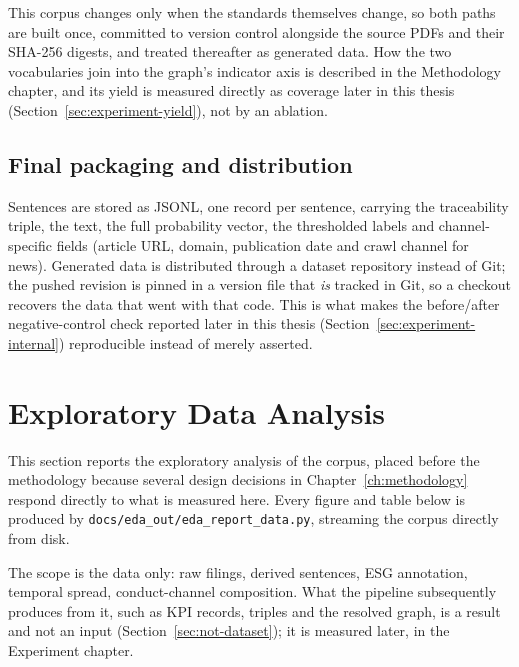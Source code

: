 \documentclass[fontsize=12pt,oneside,headings=small]{scrreprt}
\begin{document}
This corpus changes only when the standards themselves change, so both
paths are built once, committed to version control alongside the source
PDFs and their SHA-256 digests, and treated thereafter as generated data.
How the two vocabularies join into the graph's indicator axis is described
in the Methodology chapter, and its yield is measured directly as coverage
later in this thesis (Section~\ref{sec:experiment-yield}), not by an ablation.


\subsection{Final packaging and distribution}
\label{sec:packaging}

Sentences are stored as JSONL, one record per sentence, carrying the
traceability triple, the text, the full probability vector, the thresholded
labels and channel-specific fields (article URL, domain, publication date
and crawl channel for news). Generated data is distributed through a
dataset repository instead of Git; the pushed revision is pinned in a
version file that \textit{is} tracked in Git, so a checkout recovers the
data that went with that code. This is what makes the before/after
negative-control check reported later in this thesis (Section~\ref{sec:experiment-internal})
reproducible instead of merely asserted.
\section{Exploratory Data Analysis}
\label{sec:eda}


This section reports the exploratory analysis of the corpus, placed before
the methodology because several design decisions in
Chapter~\ref{ch:methodology} respond directly to what is measured here.
Every figure and table below is produced by
\texttt{docs/eda\_out/eda\_report\_data.py}, streaming the corpus directly
from disk.

The scope is the data only: raw filings, derived sentences, ESG
annotation, temporal spread, conduct-channel composition. What the pipeline
subsequently produces from it, such as KPI records, triples and the
resolved graph, is a result and not an input (Section~\ref{sec:not-dataset});
it is measured later, in the Experiment chapter.
\end{document}
